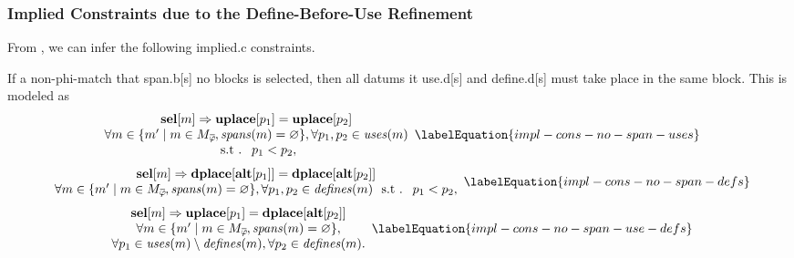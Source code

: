 \subsubsection{%
  Implied Constraints due to the Define-Before-Use Refinement%
}

From , we can infer the
following \gls{implied.c} \glspl{constraint}.

If a non-\gls{phi-match} that \gls{span.b}[s] no \glspl{block} is selected, then
all \glspl{datum} it \gls{use.d}[s] and \gls{define.d}[s] must take place in the
same \gls{block}.
%
This is modeled as
%
\begin{equation}
  \begin{array}{c}
    \mVar{sel}[m] \mImp \mVar{uplace}[p_1] = \mVar{uplace}[p_2] \\
    \forall m \in
      \mSetBuilder{m'}%
                  {%
                    m \in \mPhiMatchCompSet \hspace{-1pt},
                    \mSpans(m) = \mEmptySet
                  },
    \forall p_1, p_2 \in \mUses(m) \\
    \text{\st } p_1 < p_2,
  \end{array}
  \labelEquation{impl-cons-no-span-uses}
\end{equation}
%
\begin{equation}
  \begin{array}{c}
    \mVar{sel}[m]
    \mImp
    \mVar{dplace}[\mVar{alt}[p_1]] = \mVar{dplace}[\mVar{alt}[p_2]] \\
    \forall m \in
      \mSetBuilder{m'}%
                  {%
                    m \in \mPhiMatchCompSet \hspace{-1pt},
                    \mSpans(m) = \mEmptySet
                  },
    \forall p_1, p_2 \in \mDefines(m) \text{ \st } p_1 < p_2,
  \end{array}
  \labelEquation{impl-cons-no-span-defs}
\end{equation}
%
\begin{equation}
  \begin{array}{c}
    \mVar{sel}[m]
    \mImp
    \mVar{uplace}[p_1] = \mVar{dplace}[\mVar{alt}[p_2]] \\
    \forall m \in
      \mSetBuilder{m'}%
                  {%
                    m \in \mPhiMatchCompSet \hspace{-1pt},
                    \mSpans(m) = \mEmptySet
                  }, \\
    \forall p_1 \in \mUses(m) \setminus \mDefines(m),
    \forall p_2 \in \mDefines(m).
  \end{array}
  \labelEquation{impl-cons-no-span-use-defs}
\end{equation}

